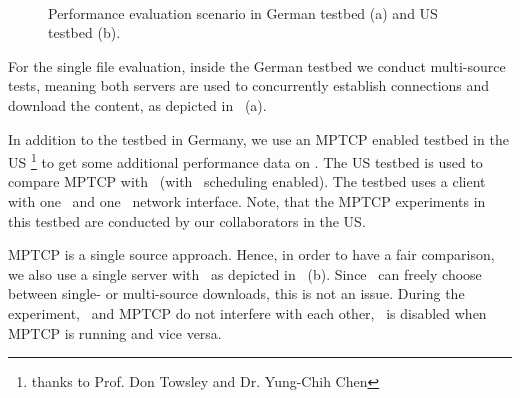 \begin{figure}[!htb]
        \begin{minipage}[t]{0.5\linewidth}
		\begin{center}
        \end{center}
        \end{minipage}
~
        \begin{minipage}[t]{0.5\linewidth}
        \begin{center}
        \end{center}
        \end{minipage}
        \caption{\label{fig:evaluation-scenarios} Performance evaluation scenario in German testbed (a) and US testbed (b).}
  \vspace*{-0.3cm}
\end{figure}

For the single file evaluation, inside the German testbed we conduct multi-source tests, meaning both servers are used to concurrently establish connections and download the content, as depicted in~ (a). 

In addition to the testbed in Germany, we use an MPTCP enabled testbed in the US \footnote{thanks to Prof. Don Towsley and Dr. Yung-Chih Chen} to get some additional performance data on \mhttp. 
The US testbed is used to compare MPTCP with \mhttp~(with \algslice~scheduling enabled). 
The testbed uses a client with one \wifi~and one \lte~network interface. 
Note, that the MPTCP experiments in this testbed are conducted by our collaborators in the US. 

MPTCP is a single source approach. 
Hence, in order to have a fair comparison, we also use a single server with \mhttp~as depicted in~ (b). 
Since \mhttp~can freely choose between single- or multi-source downloads, this is not an issue. 
During the experiment, \mhttp~and MPTCP do not interfere with each other, \ie \mhttp~is disabled when MPTCP is running and vice versa. 

